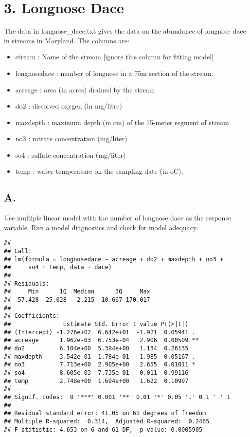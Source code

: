 \documentclass[]{article}
\providecommand{\tightlist}{%
  \setlength{\itemsep}{0pt}\setlength{\parskip}{0pt}}
\begin{document}
\section{3. Longnose Dace}\label{longnose-dace}

The data in longnose\_dace.txt gives the data on the abundance of
longnose dace in streams in Maryland. The columns are:

\begin{itemize}
\tightlist
\item
  stream : Name of the stream {[}ignore this column for fitting model{]}
\item
  longnosedace : number of longnose in a 75m section of the stream.
\item
  acreage : area (in acres) drained by the stream
\item
  do2 : dissolved oxygen (in mg/litre)
\item
  maxdepth : maximum depth (in cm) of the 75-meter segment of stream
\item
  no3 : nitrate concentration (mg/liter)
\item
  so4 : sulfate concentration (mg/liter)
\item
  temp : water temperature on the sampling date (in oC).
\end{itemize}

\subsection{A.}\label{a.-1}

Use multiple linear model with the number of longnose dace as the
response variable. Run a model diagnostics and check for model adequacy.

\begin{verbatim}
## 
## Call:
## lm(formula = longnosedace ~ acreage + do2 + maxdepth + no3 + 
##     so4 + temp, data = dace)
## 
## Residuals:
##     Min      1Q  Median      3Q     Max 
## -57.428 -25.028  -2.215  10.667 170.017 
## 
## Coefficients:
##               Estimate Std. Error t value Pr(>|t|)   
## (Intercept) -1.276e+02  6.642e+01  -1.921  0.05941 . 
## acreage      1.962e-03  6.753e-04   2.906  0.00509 **
## do2          6.104e+00  5.384e+00   1.134  0.26135   
## maxdepth     3.542e-01  1.784e-01   1.985  0.05167 . 
## no3          7.713e+00  2.905e+00   2.655  0.01011 * 
## so4         -8.605e-03  7.735e-01  -0.011  0.99116   
## temp         2.748e+00  1.694e+00   1.622  0.10997   
## ---
## Signif. codes:  0 '***' 0.001 '**' 0.01 '*' 0.05 '.' 0.1 ' ' 1
## 
## Residual standard error: 41.05 on 61 degrees of freedom
## Multiple R-squared:  0.314,  Adjusted R-squared:  0.2465 
## F-statistic: 4.653 on 6 and 61 DF,  p-value: 0.0005905
\end{verbatim}
\end{document}
